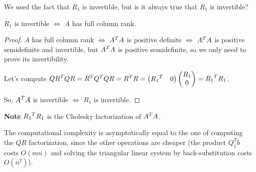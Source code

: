\documentclass[computational_mathematics.tex]{subfiles}
\begin{document}
We used the fact that $R_{1}$ is invertible, but is it always true that $R_{1}$ is invertible?

\begin{lemma}
  $R_{1}$ is invertible $\Leftrightarrow$ $A$ has full column rank.
\end{lemma}

\begin{proof}
  $A$ has full column rank $\Leftrightarrow$ ${A}^{T}A$ is positive definite $\Leftrightarrow$ ${A}^{T}A$ is positive semidefinite and invertible, but ${A}^{T}A$ is positive semidefinite, so we only need to prove its invertibility.
  
  Let's compute ${QR}^{T} QR = {R}^{T} {Q}^{T} Q R = {R}^{T} R = \begin{pmatrix} {R_{1}}^{T} & 0 \end{pmatrix} \begin{pmatrix} R_{1}\\ 0 \end{pmatrix} = {R_{1}}^{T} R_1$.
    
    So, ${A}^{T}A$ is invertible $\Leftrightarrow$ $R_1$ is invertible.
\end{proof}

\begin{myframe}{\bf Note}
${R_{1}}^{T}R_{1}$ is the Cholesky factorization of ${A}^{T}A$.
\end{myframe}

The computational complexity is asymptotically equal to the one of computing the $QR$ factorization, since the other operations are cheaper (the product $Q_1^Tb$ costs $O(mn)$ and solving the triangular linear system by back-substitution costs $O(n^2)$).
\end{document}

